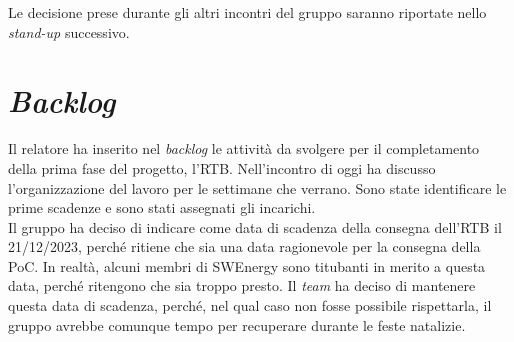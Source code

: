 Le decisione prese durante gli altri incontri del gruppo saranno riportate nello
\textit{stand-up} successivo.

\section{\textit{Backlog}}

Il relatore ha inserito nel \textit{backlog} le attività da svolgere per
il completamento della prima fase del progetto, l'RTB. Nell'incontro di oggi ha
discusso l'organizzazione del lavoro per le settimane che verrano. Sono state
identificare le prime scadenze e sono stati assegnati gli incarichi. \\
Il gruppo ha deciso di indicare come data di scadenza della consegna dell'RTB il
21/12/2023, perché ritiene che sia una data ragionevole per la consegna della
PoC. In realtà, alcuni membri di SWEnergy sono titubanti in merito a questa
data, perché ritengono che sia troppo presto. Il \textit{team} ha deciso di
mantenere questa data di scadenza, perché, nel qual caso non fosse possibile
rispettarla, il gruppo avrebbe comunque tempo per recuperare durante le feste
natalizie. \\
